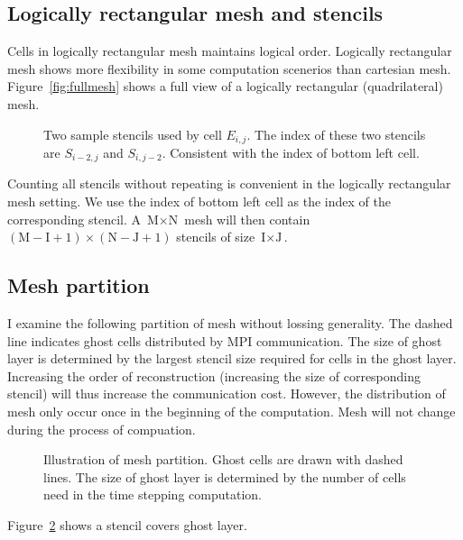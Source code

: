 \documentclass[smallextended]{svjour3}       %
\begin{document}
\subsection{Logically rectangular mesh and stencils}
Cells in logically rectangular mesh maintains logical 
order. Logically rectangular mesh shows more flexibility 
in some computation scenerios than cartesian mesh.
Figure~\ref{fig:fullmesh} 
shows a full view of a logically rectangular (quadrilateral) mesh.
\begin{figure}[htb]
		  \parbox{\textwidth}{\begin{minipage}[t]{0.45\textwidth}
		  
		  \caption{Logically rectangular 
		  mesh displayed in full. The index of 
		  a stencil (colored cells) is the 
		  same as the index of the red cell.}
\label{fig:fullmesh}
		  \end{minipage}
		  \hfill
		  \begin{minipage}[t]{.45\textwidth}

					 \caption{Two sample stencils used by cell $E_{i,j}$.
					 The index of these two stencils are $S_{i-2,j}$ and $S_{i,j-2}$.
					 Consistent with the index of bottom left cell.}
		  \label{fig:stencil}
		  \end{minipage}}
\end{figure}
Counting all stencils without repeating is convenient 
in the logically rectangular mesh setting. 
We use the index of bottom left cell as the index of 
the corresponding stencil. A $\text{M}\times \text{N}$ mesh will then contain
$(\text{M}-\text{I}+1)\times(\text{N}-\text{J}+1)$ stencils 
of size $\text{I}\times \text{J}$.

\subsection{Mesh partition}
I examine the following partition of mesh without lossing generality.
The dashed line indicates ghost cells distributed by
MPI communication. 
The size of ghost layer is determined by the largest stencil
size required for cells in the ghost layer.
Increasing the order of reconstruction (increasing the size
of corresponding stencil) will thus increase the communication 
cost. However, the distribution of mesh only occur once 
in the beginning of the computation. Mesh will not change during
the process of compuation.
\begin{figure}\label{fig:partitionmesh}

		  \caption{Illustration of mesh partition.
		  Ghost cells are drawn with dashed lines.
		  The size of ghost layer is determined 
		  by the number of cells need in the 
		  time stepping computation.}
\end{figure}
Figure~\ref{fig:partitionmesh} shows a stencil
covers ghost layer.
\end{document}
